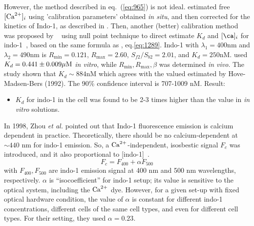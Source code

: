 However, the method described in eq.~(\ref{eq:965}) is not ideal.
\citep{balke1994} estimated free $[{\text{Ca}^{2+}}]_i$ using 'calibration parameters'
obtained {\it in situ}, and then corrected for the kinetics of Indo-1, as
described in \citep{sipido1991}. Then, another (better) calibration method was
proposed by ~\cite{bassani1995a} using null point technique to direct estimate
$K_d$ and $[\ca]_i$ for indo-1~\citep{bassani1995a}, based on the same formula as
\citep{grynkiewicz1985}, eq.\ref{eq:1289}. Indo-1 with $\lambda_1=400$nm and
$\lambda_2=490$nm is $R_\min = 0.121$, $R_\max=2.60$, $S_{f2}/S_{b2}=2.01$, and
$K_d = 250$nM. \citep{bassani1995rdc} used $K_d = 0.441 \pm 0.009{\mu\text{M}}$ {\it in
vitro}, while $R_\min, R_\max, \beta$ was determined {\it in vivo}. The study
shown that $K_d\sim 884$nM which agrees with the valued estimated by
Hove-Madsen-Bers (1992). The 90\% confidence interval is 707-1009 nM. Result:
\begin{itemize}
\item $K_d$ for indo-1 in the cell was found to be 2-3 times higher
  than the value in {\it in vitro} solutions.
\end{itemize}

In 1998, Zhou {\it et al.} pointed out that Indo-1 fluorescence emission is
calcium dependent in practice. Theoretically, there should be no
calcium-dependent at $\sim 440$ nm for indo-1 emission. So, a ${\text{Ca}^{2+}}$-independent,
isosbestic signal $F_c$ was introduced, and it also proportional to
[indo-1]~\citep{zhou1998}.
\begin{equation}
  \label{eq:978}
  F_c = F_{400} + \alpha F_{500}
\end{equation}
with $F_{400},F_{500}$ are indo-1 emission signal at 400 nm and 500
nm wavelengths, respectively. $\alpha$ is ``isocoefficient'' for
indo-1 setup; its value is sensitive to the optical system, including
the ${\text{Ca}^{2+}}$ dye. However, for a given set-up with fixed optical hardware
condition, the value of $\alpha$ is constant for different indo-1
concentrations, different cells of the same cell types, and even for
different cell types. For their setting, they used $\alpha = 0.23$.

